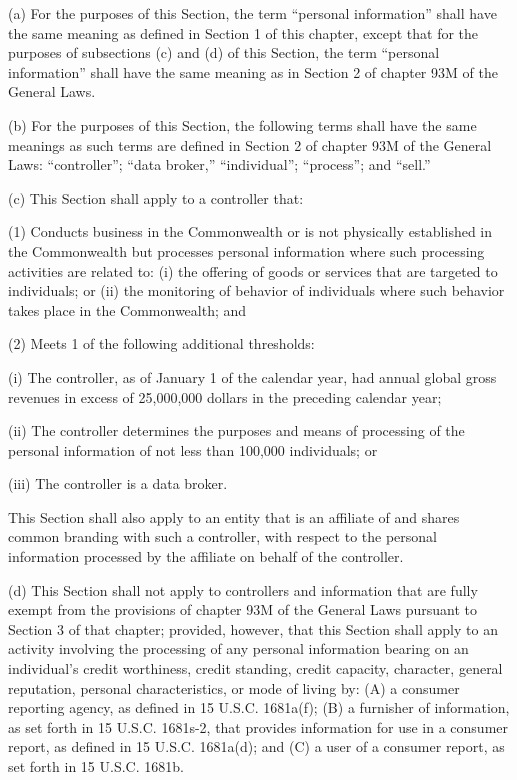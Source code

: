 (a) For the purposes of this Section, the term “personal information” shall have the same meaning as defined in Section 1 of this chapter, except that for the purposes of subsections (c) and (d) of this Section, the term “personal information” shall have the same meaning as in Section 2 of chapter 93M of the General Laws. 

(b) For the purposes of this Section, the following terms shall have the same meanings as such terms are defined in Section 2 of chapter 93M of the General Laws: “controller”; “data broker,” “individual”; “process”; and “sell.”

(c) This Section shall apply to a controller that:

(1) Conducts business in the Commonwealth or is not physically established in the Commonwealth but processes personal information where such processing activities are related to: (i) the offering of goods or services that are targeted to individuals; or (ii) the monitoring of behavior of individuals where such behavior takes place in the Commonwealth; and

(2) Meets 1 of the following additional thresholds:

(i) The controller, as of January 1 of the calendar year, had annual global gross revenues in excess of 25,000,000 dollars in the preceding calendar year;

(ii) The controller determines the purposes and means of processing of the personal information of not less than 100,000 individuals; or

(iii) The controller is a data broker.

This Section shall also apply to an entity that is an affiliate of and shares common branding with such a controller, with respect to the personal information processed by the affiliate on behalf of the controller.

(d) This Section shall not apply to controllers and information that are fully exempt from the provisions of chapter 93M of the General Laws pursuant to Section 3 of that chapter; provided, however, that this Section shall apply to an activity involving the processing of any personal information bearing on an individual’s credit worthiness, credit standing, credit capacity, character, general reputation, personal characteristics, or mode of living by: (A) a consumer reporting agency, as defined in 15 U.S.C. 1681a(f); (B) a furnisher of information, as set forth in 15 U.S.C. 1681s-2, that provides information for use in a consumer report, as defined in 15 U.S.C. 1681a(d); and (C) a user of a consumer report, as set forth in 15 U.S.C. 1681b.

